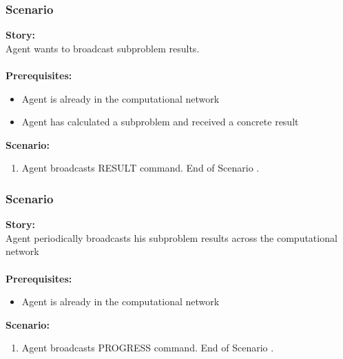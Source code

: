\documentclass{article}
\begin{document}
\subsubsection{Scenario }
\noindent\textbf{Story:} \\
Agent wants to broadcast subproblem results. \\\\
\textbf{Prerequisites:}
\begin{itemize}
    \item Agent is already in the computational network
    \item Agent has calculated a subproblem and received a concrete result
\end{itemize}
\textbf{Scenario:}
\begin{enumerate}
    \item Agent broadcasts RESULT command. End of Scenario .
\end{enumerate}

\subsubsection{Scenario }
\noindent\textbf{Story:} \\
Agent periodically broadcasts his subproblem results across the computational network \\\\
\textbf{Prerequisites:}
\begin{itemize}
    \item Agent is already in the computational network
\end{itemize}
\textbf{Scenario:}
\begin{enumerate}
    \item Agent broadcasts PROGRESS command. End of Scenario .
\end{enumerate}
\end{document}
